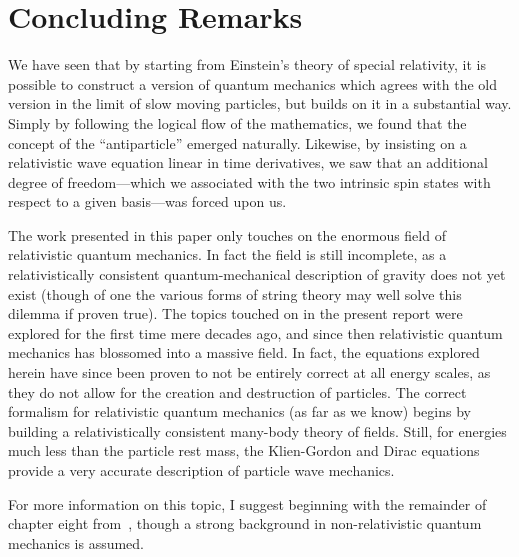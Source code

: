 \documentclass[titlepage,letterpaper,onecolumn,11pt,final]{report}
\numberwithin{equation}{section}
\numberwithin{figure}{section}
\begin{document}
\chapter{Concluding Remarks}

We have seen that by starting from Einstein's theory of special relativity, it is possible to construct a version of quantum mechanics which agrees with the old version in the limit of slow moving particles, but builds on it in a substantial way. Simply by following the logical flow of the mathematics, we found that the concept of the ``antiparticle'' emerged naturally. Likewise, by insisting on a relativistic wave equation linear in time derivatives, we saw that an additional degree of freedom---which we associated with the two intrinsic spin states with respect to a given basis---was forced upon us.

The work presented in this paper only touches on the enormous field of relativistic quantum mechanics. In fact the field is still incomplete, as a relativistically consistent quantum-mechanical description of gravity does not yet exist (though of one the various forms of string theory may well solve this dilemma if proven true). The topics touched on in the present report were explored for the first time mere decades ago, and since then relativistic quantum mechanics has blossomed into a massive field. In fact, the equations explored herein have since been proven to not be entirely correct at all energy scales, as they do not allow for the creation and destruction of particles. The correct formalism for relativistic quantum mechanics (as far as we know) begins by building a relativistically consistent many-body theory of fields. Still, for energies much less than the particle rest mass, the Klien-Gordon and Dirac equations provide a very accurate description of particle wave mechanics.

For more information on this topic, I suggest beginning with the remainder of chapter eight from~\cite{b:ModernQM}, though a strong background in non-relativistic quantum mechanics is assumed.


\nocite{*}

\end{document}
